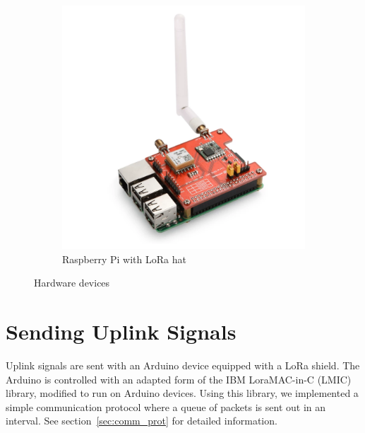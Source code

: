 \begin{figure}[H]
\begin{subfigure}[b]{0.25\textwidth}
     \label{fig:sdr}
    \end{subfigure}
    \hspace{2em}
    \begin{subfigure}[b]{0.25\textwidth}
     \includegraphics[width=1\textwidth]{figures/raspberry.png}
     \caption{Raspberry Pi with LoRa hat}
     \label{fig:rasp}
    \end{subfigure}
    \caption{Hardware devices}
\end{figure}

\section{Sending Uplink Signals}
Uplink signals are sent with an Arduino device equipped with a LoRa shield. 
The Arduino is controlled with an adapted form of the IBM LoraMAC-in-C (LMIC) library, modified to run on Arduino devices.
Using this library, we implemented a simple communication protocol where a queue of packets is sent out in an interval.
See section~\ref{sec:comm_prot} for detailed information.

